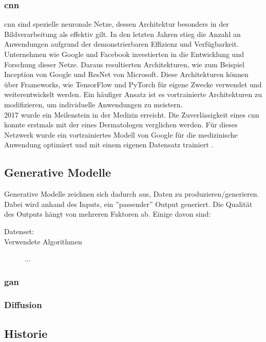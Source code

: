 \documentclass[12pt,a4paper]{article}
\begin{document}
	\subsubsection*{\ac{cnn}} %
		\ac{cnn} sind spezielle neuronale Netze, dessen Architektur besonders in der Bildverarbeitung als effektiv gilt.
		In den letzten Jahren stieg die Anzahl an Anwendungen aufgrund der demonstrierbaren Effizienz und Verfügbarkeit. 
		Unternehmen wie Google und Facebook investierten in die Entwicklung und Forschung dieser Netze.
		Daraus resultierten Architekturen, wie zum Beispiel Inception von Google und ResNet von Microsoft.
		Diese Architekturen können über Frameworks, wie TensorFlow und PyTorch für eigene Zwecke verwendet und weiterentwickelt werden.
		Ein häufiger Ansatz ist es vortrainierte Architekturen zu modifizieren, um individuelle Anwendungen zu meistern.\\
		2017 wurde ein Meilenstein in der Medizin erreicht.
		Die Zuverlässigkeit eines \ac{cnn} konnte erstmals mit der eines Dermatologen verglichen werden.
		Für dieses Netzwerk wurde ein vortrainiertes Modell von Google für die medizinische Anwendung optimiert und mit einem eigenen Datensatz trainiert \cite[\ac{vgl}][]{10.1111/bjd.18880}.

\subsection{Generative Modelle}
	Generative Modelle zeichnen sich dadurch aus, Daten zu produzieren/generieren.
	Dabei wird anhand des Inputs, ein ''passender'' Output generiert.
	Die Qualität des Outputs hängt von mehreren Faktoren ab.
	Einige davon sind: %
	\begin{description}
		\item[Datenset:]
		\item[Verwendete Algorithmen]  
		\item[] ...
	\end{description}

\subsubsection{\ac{gan}}

\subsubsection{Diffusion}

\subsection{Historie}
\end{document}
